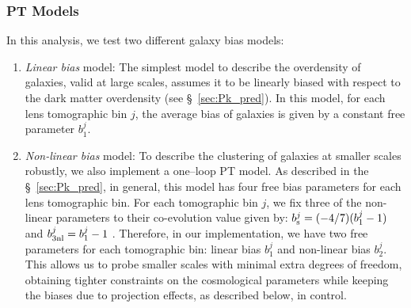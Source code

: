 \documentclass[fleqn,usenatbib]{mnras}
\newcommand{\jdr}[1]{{\color{blue}[JDR: #1]}}
\begin{document}
\subsubsection{PT Models}
\label{sec:pt_models}
In this analysis, we test two different galaxy bias models:
\begin{enumerate}
    \item \textit{Linear bias} model: The simplest model to describe the overdensity of galaxies, valid at large scales, assumes it to be linearly biased with respect to the dark matter overdensity (see \S~\ref{sec:Pk_pred}). In this model, for each lens tomographic bin $j$, the average bias of galaxies is given by a constant free parameter $b^j_1$. 
    \item \textit{Non-linear bias} model: 
    To describe the clustering of galaxies at smaller scales robustly, we also implement a one--loop PT model. As described in the \S~\ref{sec:Pk_pred}, in general, this model has four free bias parameters for each lens tomographic bin. For each tomographic bin $j$, we fix three of the non-linear parameters to their co-evolution value given by: $b^{j}_{\rm s} = (-4/7) (b^j_1 - 1)$ and $b^{j}_{\rm 3nl} = b^j_1 - 1$ \citep{McDonald2009,Saito2014a}. Therefore, in our implementation, we have two free parameters for each tomographic bin: linear bias $b^{j}_1$ and non-linear bias $b^{j}_2$. This allows us to probe smaller scales with minimal extra degrees of freedom, obtaining tighter constraints on the cosmological parameters while keeping the biases due to projection effects, as described below, in control. 
    

\end{enumerate}
\end{document}

